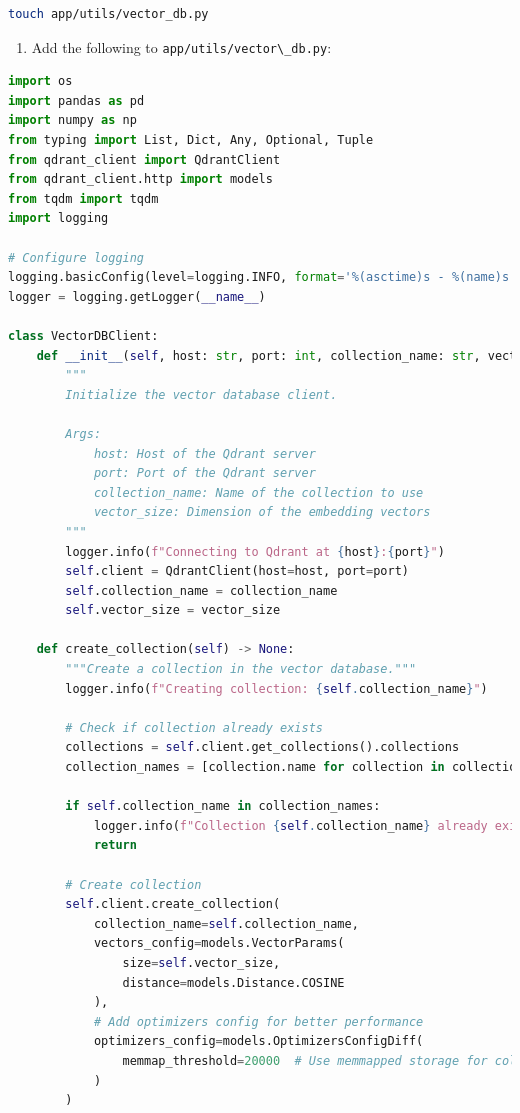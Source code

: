 \documentclass[
  screen,review,acmlarge]{acmart}
\newcommand{\passthrough}[1]{#1}
\providecommand{\tightlist}{%
  \setlength{\itemsep}{0pt}\setlength{\parskip}{0pt}}
\begin{document}
\begin{lstlisting}[language=bash]
touch app/utils/vector_db.py
\end{lstlisting}

\begin{enumerate}
\def\labelenumi{\arabic{enumi}.}
\setcounter{enumi}{3}
\tightlist
\item
  Add the following to \passthrough{\lstinline!app/utils/vector\_db.py!}:
\end{enumerate}

\begin{lstlisting}[language=Python]
import os
import pandas as pd
import numpy as np
from typing import List, Dict, Any, Optional, Tuple
from qdrant_client import QdrantClient
from qdrant_client.http import models
from tqdm import tqdm
import logging

# Configure logging
logging.basicConfig(level=logging.INFO, format='%(asctime)s - %(name)s - %(levelname)s - %(message)s')
logger = logging.getLogger(__name__)

class VectorDBClient:
    def __init__(self, host: str, port: int, collection_name: str, vector_size: int):
        """
        Initialize the vector database client.
        
        Args:
            host: Host of the Qdrant server
            port: Port of the Qdrant server
            collection_name: Name of the collection to use
            vector_size: Dimension of the embedding vectors
        """
        logger.info(f"Connecting to Qdrant at {host}:{port}")
        self.client = QdrantClient(host=host, port=port)
        self.collection_name = collection_name
        self.vector_size = vector_size
        
    def create_collection(self) -> None:
        """Create a collection in the vector database."""
        logger.info(f"Creating collection: {self.collection_name}")
        
        # Check if collection already exists
        collections = self.client.get_collections().collections
        collection_names = [collection.name for collection in collections]
        
        if self.collection_name in collection_names:
            logger.info(f"Collection {self.collection_name} already exists")
            return
        
        # Create collection
        self.client.create_collection(
            collection_name=self.collection_name,
            vectors_config=models.VectorParams(
                size=self.vector_size,
                distance=models.Distance.COSINE
            ),
            # Add optimizers config for better performance
            optimizers_config=models.OptimizersConfigDiff(
                memmap_threshold=20000  # Use memmapped storage for collections > 20k vectors
            )
        )
        

\end{lstlisting}
\end{document}
